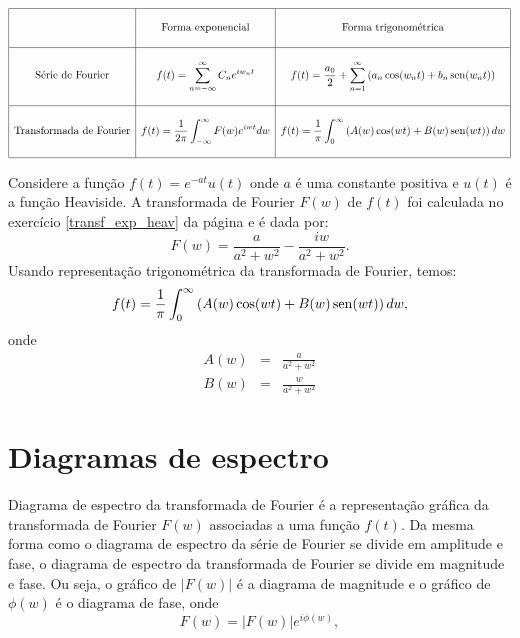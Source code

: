 $$
\begin{array}{|c|c|c|}
\hline &&\\
&\hbox{Forma exponencial}&\hbox{Forma trigonométrica}\\&&\\  \hline &&\\
\hbox{Série de Fourier}&\displaystyle f(t)=\sum_{n=-\infty}^\infty C_n e^{i w_n t} & \displaystyle  f(t)=\frac{a_0}{2}+\sum_{n=1}^\infty\left( a_n \cos(w_nt)+b_n\operatorname{sen}(w_nt)\right)   \\&&\\\hline &&\\
\hbox{Transformada de Fourier} &\displaystyle f(t)=\frac{1}{2\pi}\int_{-\infty}^\infty F(w)e^{iwt}dw &\displaystyle f(t)=\frac{1}{\pi}\int_{0}^\infty \left( A(w)\cos(wt)+ B(w)\operatorname{sen}(wt)\right)dw \\   &&\\\hline
\end{array}
$$
\begin{ex}{\label{ex_trans_rep_1}} Considere a função $f(t)=e^{-at}u(t)$ onde $a$ é uma constante positiva e $u(t)$ é a função Heaviside. A transformada de Fourier $F(w)$ de $f(t)$ foi calculada no exercício \ref{transf_exp_heav} da página \pageref{transf_exp_heav} e é dada por:
\begin{equation*}
F(w)=\frac{a}{a^2+w^2}-\frac{iw}{a^2+w^2}.
\end{equation*}
Usando representação trigonométrica da transformada de Fourier, temos:
\begin{eqnarray*}
f(t)=\frac{1}{\pi}\int_{0}^\infty\left( A(w)\cos(wt)+ B(w)\operatorname{sen}(wt)\right)dw,
\end{eqnarray*}
onde
\begin{eqnarray*}
A(w)&=&\frac{a}{a^2+w^2}\\
B(w)&=&\frac{w}{a^2+w^2}
\end{eqnarray*}
\end{ex}

\section{Diagramas de espectro}
Diagrama de espectro da transformada de Fourier é a representação gráfica da transformada de Fourier $F(w)$ associadas a uma função $f(t)$. Da mesma forma como o diagrama de espectro da série de Fourier se divide em amplitude e fase, o diagrama de espectro da transformada de Fourier se divide em magnitude e fase. Ou seja, o gráfico de $|F(w)|$ é a diagrama de magnitude e o gráfico de $\phi(w)$ é o diagrama de fase, onde
$$
F(w)=|F(w)|e^{i\phi(w)},
$$



